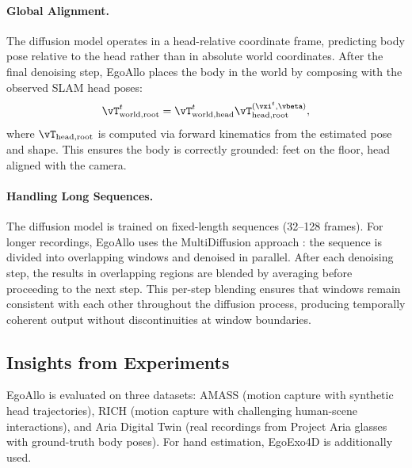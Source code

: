 \documentclass[../../book-main.tex]{subfiles}
\begin{document}
\paragraph{Global Alignment.}
The diffusion model operates in a head-relative coordinate frame,
predicting body pose relative to the head rather than in absolute
world coordinates. After the final denoising step, EgoAllo places the
body in the world by composing with the observed SLAM head poses:
\begin{equation}
    \vT_{\mathrm{world},\mathrm{root}}^{t}
    =
    \vT_{\mathrm{world},\mathrm{head}}^{t}
    \vT_{\mathrm{head},\mathrm{root}}^{(\vxi^{t}, \vbeta)} ,
\end{equation}
where \(\vT_{\mathrm{head},\mathrm{root}}\) is computed via forward
kinematics from the estimated pose and shape. This ensures the body
is correctly grounded: feet on the floor, head aligned with the camera.

\paragraph{Handling Long Sequences.}
The diffusion model is trained on fixed-length sequences (32--128
frames). For longer recordings, EgoAllo uses the MultiDiffusion
approach \citep{bar2023multidiffusion}: the sequence is divided into
overlapping windows and denoised in parallel. After each denoising
step, the results in overlapping regions are blended by averaging
before proceeding to the next step. This per-step blending ensures
that windows remain consistent with each other throughout the
diffusion process, producing temporally coherent output without
discontinuities at window boundaries.

\subsection{Insights from Experiments}
\label{sub:egoallo_experiments}

EgoAllo is evaluated on three datasets: AMASS
\citep{mahmood2019amass} (motion capture with synthetic head
trajectories), RICH \citep{huang2022rich} (motion capture with
challenging human-scene interactions), and Aria Digital Twin
\citep{pan2023aria} (real recordings from Project Aria glasses with
ground-truth body poses).  For hand estimation, EgoExo4D
\citep{grauman2023egoexo4d} is additionally used.
\end{document}
